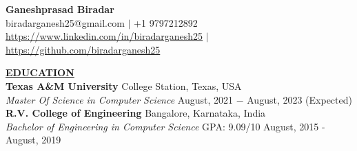 \documentclass{article}
\begin{document}
\begin{center}
\large \textbf{Ganeshprasad Biradar \\}
\normalsize biradarganesh25@gmail.com $\mid$ +1 9797212892 \\ \url{https://www.linkedin.com/in/biradarganesh25} $\mid$ \url{https://github.com/biradarganesh25} \\
\hrulefill
\end{center}





\noindent \textbf{\underline{EDUCATION}} \\
\textbf{Texas A\&M University} \hfill College Station, Texas, USA \\
\textit{Master Of Science in Computer Science}  \hfill August, 2021 $-$ August, 2023 (Expected) \\

\noindent \textbf{R.V. College of Engineering} \hfill Bangalore, Karnataka, India \\
\textit{Bachelor of Engineering in Computer Science} \hspace{1.1cm} GPA: 9.09/10 \hfill August, 2015 - August, 2019 \\
\\
\end{document}
